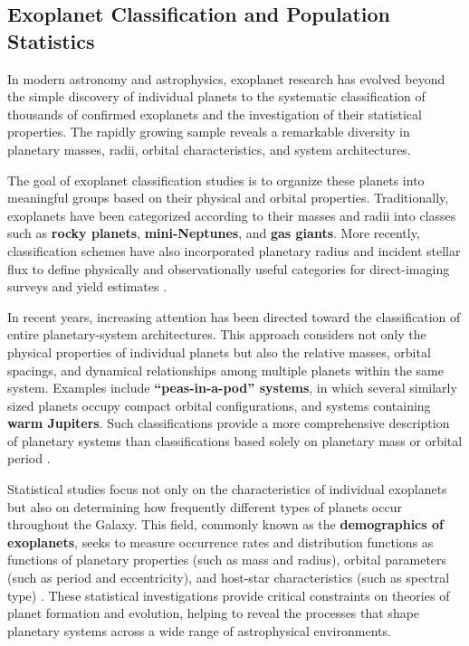 \subsection{Exoplanet Classification and Population Statistics}\label{exoplanet-classification-and-population-statistics}

In modern astronomy and astrophysics, exoplanet research has evolved beyond the simple discovery of individual planets to the systematic classification of thousands of confirmed exoplanets and the investigation of their statistical properties. The rapidly growing sample reveals a remarkable diversity in planetary masses, radii, orbital characteristics, and system architectures.

The goal of exoplanet classification studies is to organize these planets into meaningful groups based on their physical and orbital properties. Traditionally, exoplanets have been categorized according to their masses and radii into classes such as \textbf{rocky planets}, \textbf{mini-Neptunes}, and \textbf{gas giants}. More recently, classification schemes have also incorporated planetary radius and incident stellar flux to define physically and observationally useful categories for direct-imaging surveys and yield estimates \cite{kopparapu2018}.

In recent years, increasing attention has been directed toward the classification of entire planetary-system architectures. This approach considers not only the physical properties of individual planets but also the relative masses, orbital spacings, and dynamical relationships among multiple planets within the same system. Examples include \textbf{``peas-in-a-pod'' systems}, in which several similarly sized planets occupy compact orbital configurations, and systems containing \textbf{warm Jupiters}. Such classifications provide a more comprehensive description of planetary systems than classifications based solely on planetary mass or orbital period \cite{howe2025}.

Statistical studies focus not only on the characteristics of individual exoplanets but also on determining how frequently different types of planets occur throughout the Galaxy. This field, commonly known as the \textbf{demographics of exoplanets}, seeks to measure occurrence rates and distribution functions as functions of planetary properties (such as mass and radius), orbital parameters (such as period and eccentricity), and host-star characteristics (such as spectral type) \cite{gaudi2020}. These statistical investigations provide critical constraints on theories of planet formation and evolution, helping to reveal the processes that shape planetary systems across a wide range of astrophysical environments.


